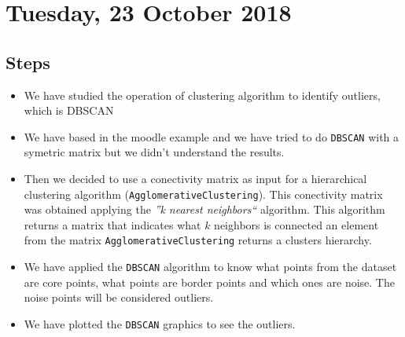 \section{Tuesday, 23 October 2018}

\subsection{Steps}
\begin{itemize}
\item We have studied the operation of clustering algorithm to identify outliers, which is DBSCAN
\item We have based in the moodle example and we have tried to do \texttt{DBSCAN}  with a symetric matrix  but we didn't understand the results.
\item Then we decided to use a conectivity matrix as input for a hierarchical clustering algorithm (\texttt{AgglomerativeClustering}). This conectivity matrix was obtained applying the \textit{''k nearest neighbors`` } algorithm. This algorithm returns a matrix that indicates what $k$ neighbors is connected an element from the matrix \texttt{AgglomerativeClustering} returns a clusters hierarchy.

\item We have applied the \texttt{DBSCAN} algorithm to know what points from the dataset are core points, what points are border points and which ones are noise. The noise points will be considered outliers.

\item We have plotted the \texttt{DBSCAN} graphics to see the outliers.

\end{itemize}